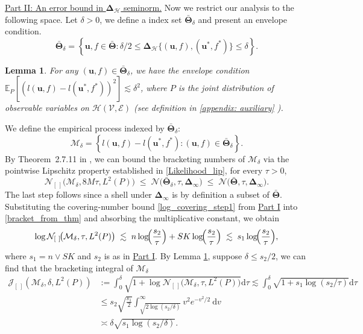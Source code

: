 \documentclass[
  12pt]{article}
\newtheorem{lemma}{Lemma}
\begin{document}
\underline{Part II: An error bound in $\mathbf{\Delta}_{\mathcal{H}}$ seminorm.} Now we restrict our analysis to the following space. Let $\delta >0$, we define a index set $\bar{\boldsymbol{\Theta}}_\delta$ and present an envelope condition.
$$\bar{\boldsymbol{\Theta}}_\delta=\left\{\boldsymbol{u},f \in \bar{\boldsymbol{\Theta}}: \delta /2 \leq \mathbf{\Delta}_{\mathcal{H}}\{(\boldsymbol{u},f),(\boldsymbol{u}^*,f^*)\} \leq \delta\right\}.$$
\begin{lemma}\label{3_4_2_condition}
For any $(\boldsymbol{u},f) \in \bar{\boldsymbol{\Theta}}_\delta$, we have the envelope condition $\mathbb{E}_{P}[(l(\boldsymbol{u},f)-l(\boldsymbol{u}^*,f^*))^2]\lesssim \delta^2$, where $P$ is the joint distribution of observable variables on $\mathcal{H}(\mathcal{V}, \mathcal{E})$ (see definition in \ref{appendix: auxiliary} ).
\end{lemma}
\noindent We define the empirical process indexed by $\bar{\boldsymbol{\Theta}}_\delta$:
$$\mathcal{M}_{\delta}=\left\{l(\boldsymbol{u},f)-l(\boldsymbol{u}^*,f^*): (\boldsymbol{u},f) \in \bar{\boldsymbol{\Theta}}_\delta \right\} .$$
By Theorem~2.7.11 in \cite{van1996weak}, we can bound the bracketing numbers of $\mathcal{M}_{\delta}$ via the pointwise Lipschitz
property established in \eqref{Likelihood_lip}, for every
$\tau>0$,
\begin{equation}\label{bracket_from_thm}
  \mathcal{N}_{[\ ]}\!\bigl( \mathcal{M}_{\delta},8M\tau,
   L^2(P)\bigr)
  \;\leq\;
  \mathcal{N}\!\bigl(\bar{\boldsymbol{\Theta}}_\delta,\tau,\mathbf{\Delta}_\infty\bigr)\;\leq\;
  \mathcal{N}\!\bigl(\bar{\boldsymbol{\Theta}},\tau,\mathbf{\Delta}_\infty\bigr).
\end{equation}
The last step follows since a shell under $\mathbf{\Delta}_{\infty}$ is by definition a subset of $\bar{\boldsymbol{\Theta}}$. Substituting the covering-number bound \eqref{log_covering_step1} from \underline{Part I} into
\eqref{bracket_from_thm} and absorbing the
multiplicative constant, we obtain
\begin{equation}\label{log_bracket}
  \log\mathcal{N}_{[\ ]}\!\bigl(\mathcal{M}_{\delta},\tau,L^2(P)\bigr)
  \;\lesssim\;
  n\log\!\Bigl(\frac{s_2}{\tau}\Bigr)
  + SK\log\!\Bigl(\frac{s_2}{\tau}\Bigr)
  \;\lesssim\;
  s_1\log\!\Bigl(\frac{s_2}{\tau}\Bigr),
\end{equation}
where $s_1=n\vee SK$ and $s_2$ is as in \underline{Part I}.
\noindent By Lemma \ref{3_4_2_condition}, suppose $\delta \leq s_2/2$, we can find that the bracketing integral of $\mathcal{M}_{\delta}$
\begin{align}
\mathcal{J}_{[\ ]}\left( \mathcal{M}_{\delta},\delta,L^2(P)\right) & :=\int_0^\delta \sqrt{1+ \log\mathcal{N}_{[\ ]}\!\bigl(\mathcal{M}_{\delta},\tau,L^2(P)\bigr)} \mathrm{d} \tau \lesssim \int_0^\delta \sqrt{1+s_1 \log \left(s_2 / \tau\right)} \mathrm{d} \tau \nonumber\\
& \leq s_2 \sqrt{\frac{s_1}{2}} \int_{\sqrt{2 \log \left(s_2 / \delta\right)}}^{\infty} v^2 e^{-v^2 / 2} \mathrm{~d} v \nonumber\\
& \asymp \delta \sqrt{s_1 \log \left(s_2 / \delta\right)}.\label{bracketing_intergral}
\end{align}
\end{document}
